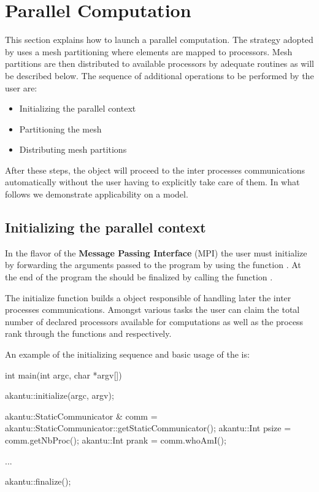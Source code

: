 \chapter{Parallel Computation}

This section explains how to launch a parallel computation.
The strategy adopted by \akantu uses a mesh partitioning 
where elements are mapped to processors. Mesh partitions are
then distributed to available processors by adequate routines
as will be described below.  
The sequence of additional operations to be performed by the user are:

\begin{itemize}
\item Initializing the parallel context
\item Partitioning the mesh
\item Distributing mesh partitions
\end{itemize}

After these steps, the 
object will proceed to the inter processes communications automatically
without the user having to explicitly take care of them.
In what follows we demonstrate applicability on a 
 model.

\section{Initializing the parallel context}

In the flavor of the \textbf{Message Passing Interface} (MPI) 
the user must initialize \akantu by forwarding the arguments passed to the program
by using the function . At the end of the program the 
\akantu should be finalized by calling the function .  

The initialize function builds a  object 
responsible of handling later the inter processes communications.
Amongst various tasks the user can claim the total number of declared 
processors available for computations as well as the process rank through 
the functions  and  respectively.

An example of the initializing sequence and basic usage of the 
 is:

\begin{cpp}
int main(int argc, char *argv[])
{
  akantu::initialize(argc, argv);

  akantu::StaticCommunicator & comm =
  akantu::StaticCommunicator::getStaticCommunicator();
  akantu::Int psize = comm.getNbProc();
  akantu::Int prank = comm.whoAmI();

  ... 

  akantu::finalize();
}
\end{cpp} 

